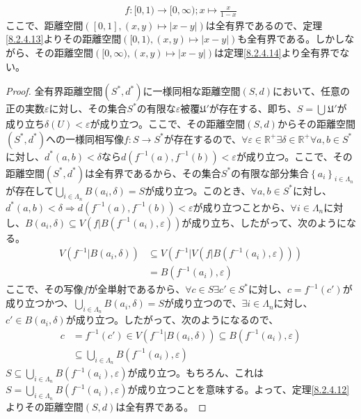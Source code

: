 \documentclass[dvipdfmx]{jsarticle}
\begin{document}
\begin{align*}
f:[0,1) \rightarrow [0,\infty) ;x\mapsto \frac{x}{1 - x} 
\end{align*}
ここで、距離空間$\left([0,1],\left( x,y\right) \mapsto \left| x - y \right| \right)$は全有界であるので、定理\ref{8.2.4.13}よりその距離空間$\left([0,1),\left( x,y\right) \mapsto \left| x - y \right| \right)$も全有界である。しかしながら、その距離空間$\left([0,\infty),\left( x,y\right) \mapsto \left| x - y \right| \right)$は定理\ref{8.2.4.14}より全有界でない。
\begin{proof}
全有界距離空間$\left( S^{*},d^{*} \right)$に一様同相な距離空間$(S,d)$において、任意の正の実数$\varepsilon$に対し、その集合$S^{*}$の有限な$\varepsilon$被覆$\mathfrak{U}'$が存在する、即ち、$S = \bigcup_{} \mathfrak{U}'$が成り立ち$\delta(U) < \varepsilon$が成り立つ。ここで、その距離空間$(S,d)$からその距離空間$\left( S^{*},d^{*} \right)$への一様同相写像$f:S \rightarrow S^{*}$が存在するので、$\forall\varepsilon \in \mathbb{R}^{+}\exists\delta \in \mathbb{R}^{+}\forall a,b \in S^{*}$に対し、$d^{*}(a,b) < \delta$なら$d\left( f^{- 1}(a),f^{- 1}(b) \right) < \varepsilon$が成り立つ。ここで、その距離空間$\left( S^{*},d^{*} \right)$は全有界であるから、その集合$S^{*}$の有限な部分集合$\left\{ a_{i} \right\}_{i \in \varLambda_{n}}$が存在して$\bigcup_{i \in \varLambda_{n}} {B\left( a_{i},\delta \right)} = S$が成り立つ。このとき、$\forall a,b \in S^{*}$に対し、$d^{*}(a,b) < \delta \Rightarrow d\left( f^{- 1}(a),f^{- 1}(b) \right) < \varepsilon$が成り立つことから、$\forall i \in \varLambda_{n}$に対し、$B\left( a_{i},\delta \right) \subseteq V\left( f|B\left( f^{- 1}\left( a_{i} \right),\varepsilon \right) \right)$が成り立ち、したがって、次のようになる。
\begin{align*}
V\left( f^{- 1}|B\left( a_{i},\delta \right) \right) &\subseteq V\left( f^{- 1}|V\left( f|B\left( f^{- 1}\left( a_{i} \right),\varepsilon \right) \right) \right)\\
&= B\left( f^{- 1}\left( a_{i} \right),\varepsilon \right)
\end{align*}
ここで、その写像$f$が全単射であるから、$\forall c \in S\exists c' \in S^{*}$に対し、$c = f^{- 1}\left( c' \right)$が成り立つかつ、$\bigcup_{i \in \varLambda_{n}} {B\left( a_{i},\delta \right)} = S$が成り立つので、$\exists i \in \varLambda_{n}$に対し、$c' \in B\left( a_{i},\delta \right)$が成り立つ。したがって、次のようになるので、
\begin{align*}
c &= f^{- 1}\left( c' \right) \in V\left( f^{- 1}|B\left( a_{i},\delta \right) \right) \subseteq B\left( f^{- 1}\left( a_{i} \right),\varepsilon \right)\\
&\subseteq \bigcup_{i \in \varLambda_{n}} {B\left( f^{- 1}\left( a_{i} \right),\varepsilon \right)}
\end{align*}
$S \subseteq \bigcup_{i \in \varLambda_{n}} {B\left( f^{- 1}\left( a_{i} \right),\varepsilon \right)}$が成り立つ。もちろん、これは$S = \bigcup_{i \in \varLambda_{n}} {B\left( f^{- 1}\left( a_{i} \right),\varepsilon \right)}$が成り立つことを意味する。よって、定理\ref{8.2.4.12}よりその距離空間$(S,d)$は全有界である。
\end{proof}
\end{document}
